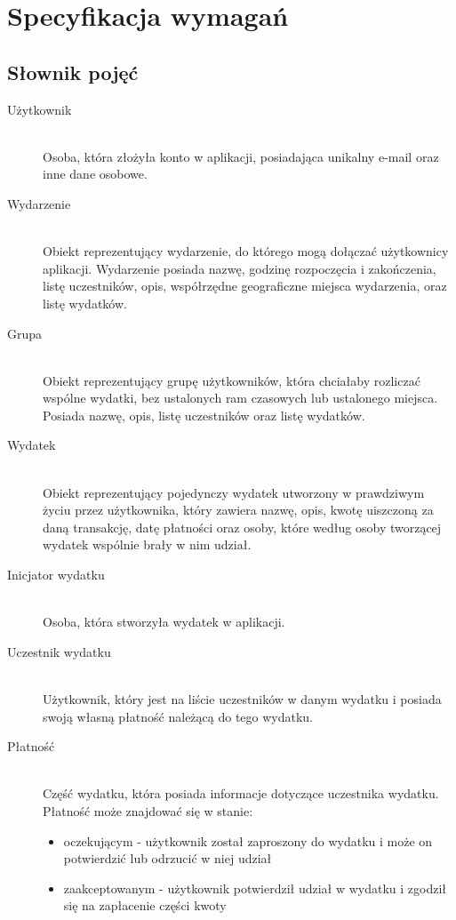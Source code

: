\newpage %

\section{Specyfikacja wymagań}
\subsection{Słownik pojęć}
\begin{description}
  \item[Użytkownik] \hfill \\ Osoba, która złożyła konto w aplikacji, posiadająca unikalny e-mail oraz inne dane osobowe.
  \item[Wydarzenie] \hfill \\ Obiekt reprezentujący wydarzenie, do którego mogą dołączać użytkownicy aplikacji. Wydarzenie posiada nazwę, godzinę rozpoczęcia i zakończenia, listę uczestników, opis, współrzędne geograficzne miejsca wydarzenia, oraz listę wydatków.
  \item[Grupa] \hfill \\ Obiekt reprezentujący grupę użytkowników, która chciałaby rozliczać wspólne wydatki, bez ustalonych ram czasowych lub ustalonego miejsca. Posiada nazwę, opis, listę uczestników oraz listę wydatków.
  \item[Wydatek] \hfill \\ Obiekt reprezentujący pojedynczy wydatek utworzony w prawdziwym życiu przez użytkownika, który zawiera nazwę, opis, kwotę uiszczoną za daną transakcję, datę płatności oraz osoby, które według osoby tworzącej wydatek wspólnie brały w nim udział.
  \item[Inicjator wydatku] \hfill \\ Osoba, która stworzyła wydatek w aplikacji.
  \item[Uczestnik wydatku] \hfill \\ Użytkownik, który jest na liście uczestników w danym wydatku i posiada swoją własną płatność należącą do tego wydatku.
  \item[Płatność] \hfill \\ Część wydatku, która posiada informacje dotyczące uczestnika wydatku. Płatność może znajdować się w stanie:
    \begin{itemize}
    \item oczekującym - użytkownik został zaproszony do wydatku i może on potwierdzić lub odrzucić w niej udział
    \item zaakceptowanym - użytkownik potwierdził udział w wydatku i zgodził się na zapłacenie części kwoty

\end{itemize}
\end{description}
